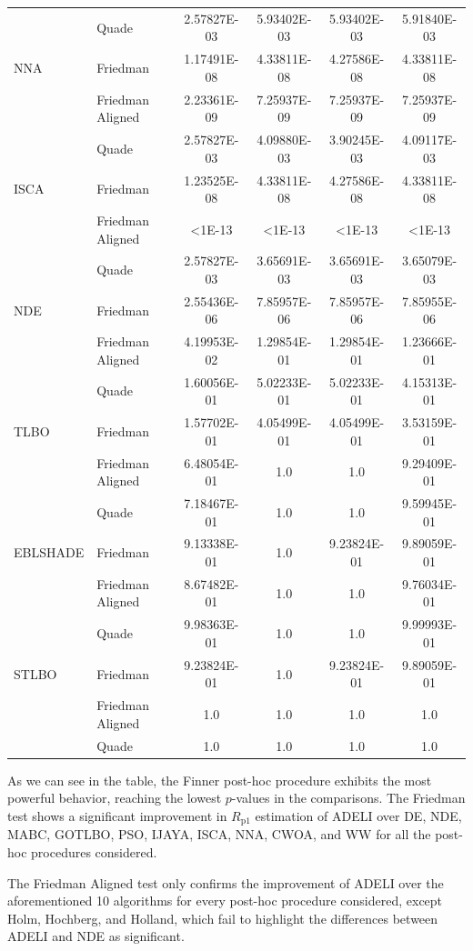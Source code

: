 \documentclass[a4paper,fleqn]{cas-dc}
\begin{document}
\begin{table}[<options>]
\begin{tabular*}{\tblwidth}{@{}LLCCCC@{}}
&Quade&2.57827E-03&5.93402E-03&5.93402E-03&5.91840E-03\\
NNA&Friedman&1.17491E-08&4.33811E-08&4.27586E-08&4.33811E-08\\
&Friedman Aligned&2.23361E-09&7.25937E-09&7.25937E-09&7.25937E-09\\
&Quade&2.57827E-03&4.09880E-03&3.90245E-03&4.09117E-03\\
ISCA&Friedman&1.23525E-08&4.33811E-08&4.27586E-08&4.33811E-08\\
&Friedman Aligned&<1E-13&<1E-13&<1E-13&<1E-13\\
&Quade&2.57827E-03&3.65691E-03&3.65691E-03&3.65079E-03\\
NDE&Friedman&2.55436E-06&7.85957E-06&7.85957E-06&7.85955E-06\\
&Friedman Aligned&4.19953E-02&1.29854E-01&1.29854E-01&1.23666E-01\\
&Quade&1.60056E-01&5.02233E-01&5.02233E-01&4.15313E-01\\
TLBO&Friedman&1.57702E-01&4.05499E-01&4.05499E-01&3.53159E-01\\
&Friedman Aligned&6.48054E-01&1.0&1.0&9.29409E-01\\
&Quade&7.18467E-01&1.0&1.0&9.59945E-01\\
EBLSHADE&Friedman&9.13338E-01&1.0&9.23824E-01&9.89059E-01\\
&Friedman Aligned&8.67482E-01&1.0&1.0&9.76034E-01\\
&Quade&9.98363E-01&1.0&1.0&9.99993E-01\\
STLBO&Friedman&9.23824E-01&1.0&9.23824E-01&9.89059E-01\\
&Friedman Aligned&1.0&1.0&1.0&1.0\\
&Quade&1.0&1.0&1.0&1.0\\
\bottomrule
\end{tabular*}
\end{table}


As we can see in the table, the Finner post-hoc procedure exhibits the most powerful behavior,
reaching the lowest $p$-values in the comparisons.
The Friedman test shows a significant improvement in $R_\mathrm{p1}$ estimation of ADELI over
DE, NDE, MABC, GOTLBO, PSO, IJAYA, ISCA, NNA, CWOA, and WW
for all the post-hoc procedures considered.

The Friedman Aligned test only confirms the improvement of ADELI
over the aforementioned 10 algorithms for every post-hoc procedure considered,
except Holm, Hochberg, and Holland,
which fail to highlight the differences between ADELI and NDE as significant.
\end{document}
